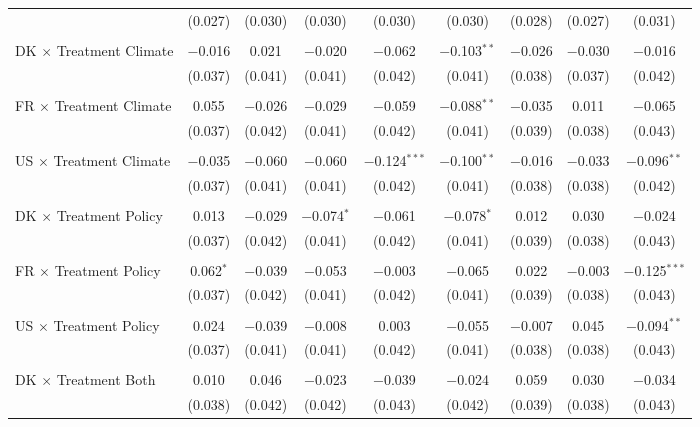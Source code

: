 \begin{tabular}{@{\extracolsep{5pt}}lcccccccc}
  & (0.027) & (0.030) & (0.030) & (0.030) & (0.030) & (0.028) & (0.027) & (0.031) \\ 
  & & & & & & & & \\ 
 DK $\times$ Treatment Climate & $-$0.016 & 0.021 & $-$0.020 & $-$0.062 & $-$0.103$^{**}$ & $-$0.026 & $-$0.030 & $-$0.016 \\ 
  & (0.037) & (0.041) & (0.041) & (0.042) & (0.041) & (0.038) & (0.037) & (0.042) \\ 
  & & & & & & & & \\ 
 FR $\times$ Treatment Climate & 0.055 & $-$0.026 & $-$0.029 & $-$0.059 & $-$0.088$^{**}$ & $-$0.035 & 0.011 & $-$0.065 \\ 
  & (0.037) & (0.042) & (0.041) & (0.042) & (0.041) & (0.039) & (0.038) & (0.043) \\ 
  & & & & & & & & \\ 
 US $\times$ Treatment Climate & $-$0.035 & $-$0.060 & $-$0.060 & $-$0.124$^{***}$ & $-$0.100$^{**}$ & $-$0.016 & $-$0.033 & $-$0.096$^{**}$ \\ 
  & (0.037) & (0.041) & (0.041) & (0.042) & (0.041) & (0.038) & (0.038) & (0.042) \\ 
  & & & & & & & & \\ 
 DK $\times$ Treatment Policy & 0.013 & $-$0.029 & $-$0.074$^{*}$ & $-$0.061 & $-$0.078$^{*}$ & 0.012 & 0.030 & $-$0.024 \\ 
  & (0.037) & (0.042) & (0.041) & (0.042) & (0.041) & (0.039) & (0.038) & (0.043) \\ 
  & & & & & & & & \\ 
 FR $\times$ Treatment Policy & 0.062$^{*}$ & $-$0.039 & $-$0.053 & $-$0.003 & $-$0.065 & 0.022 & $-$0.003 & $-$0.125$^{***}$ \\ 
  & (0.037) & (0.042) & (0.041) & (0.042) & (0.041) & (0.039) & (0.038) & (0.043) \\ 
  & & & & & & & & \\ 
 US $\times$ Treatment Policy & 0.024 & $-$0.039 & $-$0.008 & 0.003 & $-$0.055 & $-$0.007 & 0.045 & $-$0.094$^{**}$ \\ 
  & (0.037) & (0.041) & (0.041) & (0.042) & (0.041) & (0.038) & (0.038) & (0.043) \\ 
  & & & & & & & & \\ 
 DK $\times$ Treatment Both & 0.010 & 0.046 & $-$0.023 & $-$0.039 & $-$0.024 & 0.059 & 0.030 & $-$0.034 \\ 
  & (0.038) & (0.042) & (0.042) & (0.043) & (0.042) & (0.039) & (0.038) & (0.043) \\ 

\end{tabular}
